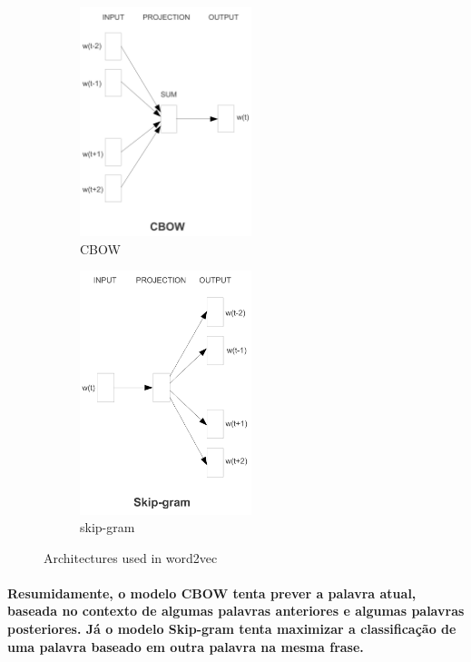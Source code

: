 \documentclass[a4paper]{article}    %
\begin{document}
\begin{figure}[H]
    \centering
    \begin{subfigure}{0.48\textwidth}
        \centering
        \includegraphics[width=5cm]{CBOW}
        \caption{CBOW}
        \label{fig:cbow}
    \end{subfigure}
    \hfill
    \begin{subfigure}{0.48\textwidth}
        \centering
        \includegraphics[width=5cm]{skip-gram}
        \caption{skip-gram}
        \label{fig:skip-gram}
    \end{subfigure}
    \caption{Architectures used in word2vec} 
    \label{fig:word2vec}
\end{figure}

\paragraph{Resumidamente, o modelo CBOW tenta prever a palavra atual, baseada no contexto de algumas palavras anteriores e algumas palavras posteriores. Já o modelo Skip-gram tenta maximizar a classificação de uma palavra baseado em outra palavra na mesma frase.}
\end{document}
